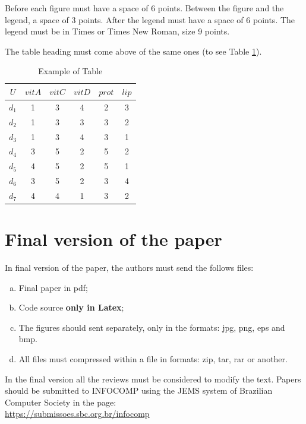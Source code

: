 \documentclass[10pt]{article}
\begin{document}
Before each figure must have a space of 6 points.  Between the figure
and the legend, a space of 3 points. After the legend must have a
space of 6 points. The legend must be in Times or Times New Roman,
size 9 points.

The table heading must come above of the same ones (to see Table
\ref{table1}).

\begin{table}[!htb]
  \begin{center}
    \caption{Example of Table}
    \label{table1}
    \vspace{0.2cm}
    \footnotesize
    \begin{tabular}{|c|c|c|c|c|c|}
      \hline
      $U$ & $vitA$ & $vitC$ & $vitD$ & $prot$ & $lip$ \\
      \hline
      \hline
      $d_1$ & 1 & 3 & 4 & 2 & 3\\
      $d_2$ & 1 & 3 & 3 & 3 & 2\\
      $d_3$ & 1 & 3 & 4 & 3 & 1\\
      $d_4$ & 3 & 5 & 2 & 5 & 2\\
      $d_5$ & 4 & 5 & 2 & 5 & 1\\
      $d_6$ & 3 & 5 & 2 & 3 & 4\\
      $d_7$ & 4 & 4 & 1 & 3 & 2\\
      \hline
    \end{tabular}
  \end{center}
\end{table}

\section{Final version of the paper}

In final version of the paper, the authors must send the follows
files: 
\begin{enumerate}[a)]
\item Final paper in pdf;
\item Code source {\bf only in Latex};
\item The figures should sent separately, only in the formats: jpg,
png, eps and bmp.
\item All files must compressed within a file in formats: zip, tar,
rar or another.
\end{enumerate}

In the final version all the reviews must be considered to modify the
text. Papers should be submitted to INFOCOMP using the JEMS system of
Brazilian Computer Society in the page:\\
\url{https://submissoes.sbc.org.br/infocomp}
\end{document}
